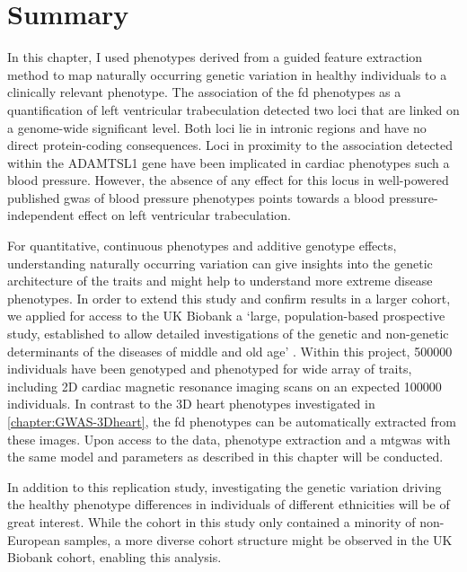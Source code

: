 \section{Summary}
In this chapter, I used phenotypes derived from a guided feature extraction method to map naturally occurring genetic variation in healthy individuals to a clinically relevant phenotype. The association of the \gls{fd} phenotypes as a quantification of left ventricular trabeculation detected two loci that are linked on a genome-wide significant level. Both loci lie in intronic regions and have no direct protein-coding consequences. Loci in proximity to the association detected within the ADAMTSL1 gene have been implicated in cardiac phenotypes such a blood pressure. However, the absence of any effect for this locus in well-powered published \gls{gwas} of blood pressure phenotypes points towards a blood pressure-independent effect on left ventricular trabeculation.

For quantitative, continuous phenotypes and additive genotype effects, understanding naturally occurring variation can give insights into the genetic architecture of the traits and might help to understand more extreme disease phenotypes. In order to extend this study and confirm results in a larger cohort, we applied for access to the UK Biobank a `large, population-based prospective study, established to allow detailed investigations of the genetic and non-genetic determinants of the diseases of middle and old age' \citep{Sudlow2015}. Within this project, \num{500000} individuals have been genotyped and phenotyped for wide array of traits, including 2D cardiac magnetic resonance imaging scans on an expected \num{100000} individuals. In contrast to the 3D heart phenotypes investigated in \cref{chapter:GWAS-3Dheart}, the \gls{fd} phenotypes can be automatically extracted from these images. Upon access to the data,  phenotype extraction and a \gls{mtgwas} with the same model and parameters as described in this chapter will be conducted. 

In addition to this replication study, investigating the genetic variation driving the healthy phenotype differences in individuals of different ethnicities \citep{Kawel2012,Captur2014} will be of great interest. While the cohort in this study only contained a minority of non-European samples, a more diverse cohort structure might be observed in the UK Biobank cohort, enabling this analysis. 
